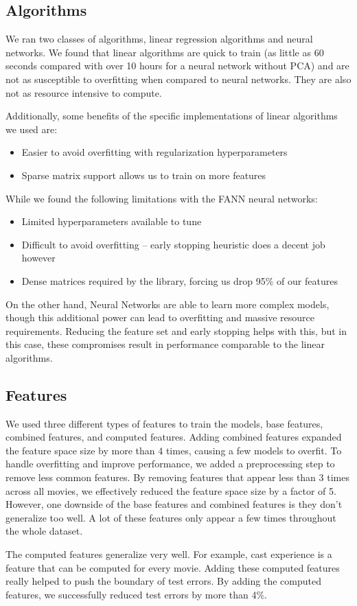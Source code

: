 \documentclass[journal]{IEEEtran}
\begin{document}
\subsection{Algorithms}
We ran two classes of algorithms, linear regression algorithms and neural networks. We found that
linear algorithms are quick to train (as little as 60 seconds compared with over 10 hours
for a neural network without PCA) and are not as susceptible to overfitting when compared to neural networks.
They are also not as resource intensive to compute.
\\
\par Additionally, some benefits of the specific implementations of linear algorithms we used are:
\begin{itemize}
    \item Easier to avoid overfitting with regularization hyperparameters
    \item Sparse matrix support allows us to train on more features
\end{itemize}
\bigskip
\par While we found the following limitations with the FANN neural networks:
\begin{itemize}
    \item Limited hyperparameters available to tune
    \item Difficult to avoid overfitting -- early stopping heuristic does a decent job however
    \item Dense matrices required by the library, forcing us drop 95\% of our features
\end{itemize}
\bigskip
\par On the other hand, Neural Networks are able to learn more complex models, though this additional
power can lead to overfitting and massive resource requirements. Reducing the feature set and early stopping helps with this, but in this
case, these compromises result in performance comparable to the linear
algorithms.

\subsection{Features}
We used three different types of features to train the models, base features, combined features, and computed features. Adding combined features expanded the feature space size by more than 4 times, causing a few models to overfit. To handle overfitting and improve performance, we added a preprocessing step to remove less common features. By removing features that appear less than 3 times across all movies, we effectively reduced the feature space size by a factor of 5. However, one downside of the base features and combined features is they don't generalize too well. A lot of these features only appear a few times throughout the whole dataset.
\\
\par The computed features generalize very well. For example, cast experience is a feature that can be computed for every movie. Adding these computed features really helped to push the boundary of test errors. By adding the computed features, we successfully reduced test errors by more than 4\%.
\end{document}

